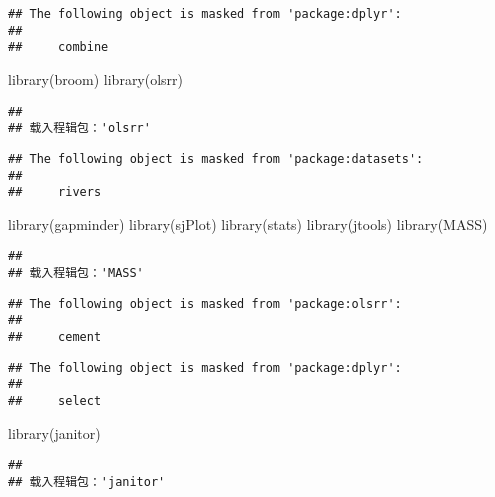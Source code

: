 \documentclass[
]{article}
\newenvironment{Shaded}{\begin{snugshade}}{\end{snugshade}}
\newcommand{\FunctionTok}[1]{\textcolor[rgb]{0.00,0.00,0.00}{#1}}
\newcommand{\NormalTok}[1]{#1}
\begin{document}
\begin{verbatim}
## The following object is masked from 'package:dplyr':
## 
##     combine
\end{verbatim}

\begin{Shaded}
\begin{Highlighting}[]
\FunctionTok{library}\NormalTok{(broom)}
\FunctionTok{library}\NormalTok{(olsrr)}
\end{Highlighting}
\end{Shaded}

\begin{verbatim}
## 
## 载入程辑包：'olsrr'
\end{verbatim}

\begin{verbatim}
## The following object is masked from 'package:datasets':
## 
##     rivers
\end{verbatim}

\begin{Shaded}
\begin{Highlighting}[]
\FunctionTok{library}\NormalTok{(gapminder)}
\FunctionTok{library}\NormalTok{(sjPlot)}
\FunctionTok{library}\NormalTok{(stats)}
\FunctionTok{library}\NormalTok{(jtools)}
\FunctionTok{library}\NormalTok{(MASS)}
\end{Highlighting}
\end{Shaded}

\begin{verbatim}
## 
## 载入程辑包：'MASS'
\end{verbatim}

\begin{verbatim}
## The following object is masked from 'package:olsrr':
## 
##     cement
\end{verbatim}

\begin{verbatim}
## The following object is masked from 'package:dplyr':
## 
##     select
\end{verbatim}

\begin{Shaded}
\begin{Highlighting}[]
\FunctionTok{library}\NormalTok{(janitor)}
\end{Highlighting}
\end{Shaded}

\begin{verbatim}
## 
## 载入程辑包：'janitor'
\end{verbatim}
\end{document}

